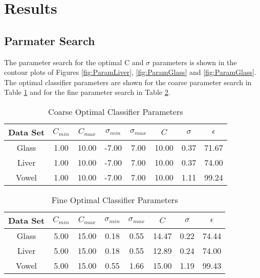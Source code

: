 \section{Results}
\label{sec:Results}

\subsection{Parmater Search}

The parameter search for the optimal C and $\sigma$ parameters is shown in the contour plots of Figures \ref{fig:ParamLiver}, \ref{fig:ParamGlass} and \ref{fig:ParamGlass}.
The optimal classifier parameters are shown for the coarse parameter search in Table \ref{tab:CoarseParamValues} and for the fine parameter search in Table \ref{tab:FineParamValues}.
\begin{table}[h!]
\caption{Coarse Optimal Classifier Parameters}
\label{tab:CoarseParamValues}
\begin{tabular}{c c c c c c c c}
\hline
Data Set & $C_{min}$ & $C_{max}$ & $\sigma_{min}$ & $\sigma_{max}$ & $C$ & $\sigma$ & $\epsilon$ \\ 
\hline
Glass & 1.00 & 10.00 & -7.00 & 7.00 & 10.00 & 0.37 & 71.67 \\ 
Liver & 1.00 & 10.00 & -7.00 & 7.00 & 10.00 & 0.37 & 74.00 \\ 
Vowel & 1.00 & 10.00 & -7.00 & 7.00 & 10.00 & 1.11 & 99.24 \\ 
\hline
\end{tabular}
\end{table}
\begin{table}[ht]
\caption{Fine Optimal Classifier Parameters}
\label{tab:FineParamValues}
\begin{tabular}{c c c c c c c c}
Data Set & $C_{min}$ & $C_{max}$ & $\sigma_{min}$ & $\sigma_{max}$ & $C$ & $\sigma$ & $\epsilon$ \\ 
\hline
Glass & 5.00 & 15.00 & 0.18 & 0.55 & 14.47 & 0.22 & 74.44 \\ 
Liver & 5.00 & 15.00 & 0.18 & 0.55 & 12.89 & 0.24 & 74.00 \\ 
Vowel & 5.00 & 15.00 & 0.55 & 1.66 & 15.00 & 1.19 & 99.43 \\ 
\hline
\end{tabular}
\end{table}
